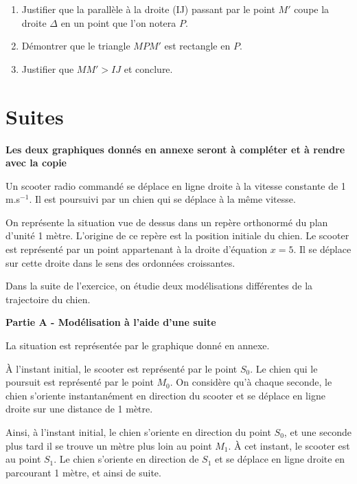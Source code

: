 \documentclass{cornouaille}
\begin{document}
\begin{exercice}
\begin{enumerate}
\medskip

	\begin{enumerate}
		\item Justifier que la parallèle à la droite (IJ) passant par le point $M'$ coupe la droite $\Delta$ en un point que l'on notera $P$.
		\item Démontrer que le triangle $MPM'$ est rectangle en $P$.
		\item Justifier que $MM' > IJ$ et conclure.
	\end{enumerate}
\end{enumerate}
\end{exercice}

\section{Suites}
\begin{exercice}


\textbf{Les deux graphiques donnés en annexe seront à compléter et à rendre avec la copie}

\medskip

Un scooter radio commandé se déplace en ligne droite à la vitesse constante de 1 m.s$^{-1}$. Il est poursuivi
par un chien qui se déplace à la même vitesse. 

On représente la situation vue de dessus dans un repère orthonormé du plan d'unité 1 mètre. L'origine de ce repère est la position initiale du chien. Le scooter est représenté par un point appartenant à la droite d'équation $x = 5$. Il se déplace sur cette droite dans le sens des ordonnées croissantes.

\smallskip

Dans la suite de l'exercice, on étudie deux modélisations différentes de la trajectoire du chien.

\bigskip

\textbf{Partie A - Modélisation à l'aide d'une suite}

\medskip

La situation est représentée par le graphique  donné en annexe.

À l'instant initial, le scooter est représenté par le point $S_0$. Le chien qui le poursuit est représenté
par le point $M_0$. On considère qu'à chaque seconde, le chien s'oriente instantanément en direction
du scooter et se déplace en ligne droite sur une distance de 1 mètre.

Ainsi, à l'instant initial, le chien s'oriente en direction du point $S_0$, et une seconde plus tard il se
trouve un mètre plus loin au point $M_1$. À cet instant, le scooter est au point $S_1$. Le chien s'oriente
en direction de $S_1$ et se déplace en ligne droite en parcourant 1 mètre, et ainsi de suite.


\end{exercice}
\end{document}
